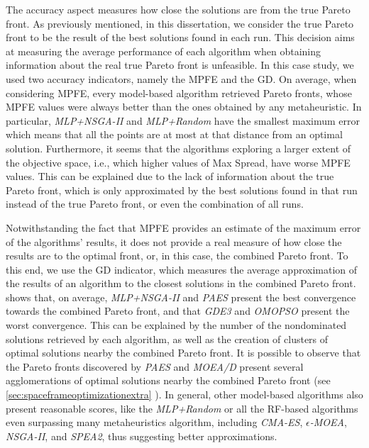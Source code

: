 The accuracy aspect measures how close the solutions are from the true Pareto front. As previously mentioned, in this dissertation, we consider the true Pareto front to be the result of the best solutions found in each run. This decision aims at measuring the average performance of each algorithm when obtaining information about the real true Pareto front is unfeasible. In this case study, we used two accuracy indicators, namely the \ac{MPFE} and the \ac{GD}. On average, when considering \ac{MPFE}, every model-based algorithm retrieved Pareto fronts, whose \ac{MPFE} values were always better than the ones obtained by any metaheuristic. In particular, \textit{MLP+NSGA-II} and \textit{MLP+Random} have the smallest maximum error which means that all the points are at most at that distance from an optimal solution. Furthermore, it seems that the algorithms exploring a larger extent of the objective space, i.e., which higher values of Max Spread, have worse \ac{MPFE} values. This can be explained due to the lack of information about the true Pareto front, which is only approximated by the best solutions found in that run instead of the true Pareto front, or even the combination of all runs. 

Notwithstanding the fact that \ac{MPFE} provides an estimate of the maximum error of the algorithms' results, it does not provide a real measure of how close the results are to the optimal front, or, in this case, the combined Pareto front. To this end, we use the \ac{GD} indicator, which measures the average approximation of the results of an algorithm to the closest solutions in the combined Pareto front.  shows that, on average, \textit{MLP+NSGA-II} and \textit{PAES} present the best convergence towards the combined Pareto front, and that \textit{GDE3} and \textit{OMOPSO} present the worst convergence. This can be explained by the number of the nondominated solutions retrieved by each algorithm, as well as the creation of clusters of optimal solutions nearby the combined Pareto front. It is possible to observe that the Pareto fronts discovered by \textit{PAES} and \textit{MOEA/D} present several agglomerations of optimal solutions nearby the combined Pareto front (see \cref{sec:spaceframeoptimizationextra} ). In general, other model-based algorithms also present reasonable scores, like the \textit{MLP+Random} or all the \ac{RF}-based algorithms even surpassing many metaheuristics algorithm, including \textit{CMA-ES}, \textit{$\epsilon$-MOEA}, \textit{\ac{NSGA-II}}, and \textit{\ac{SPEA2}}, thus suggesting better approximations.

